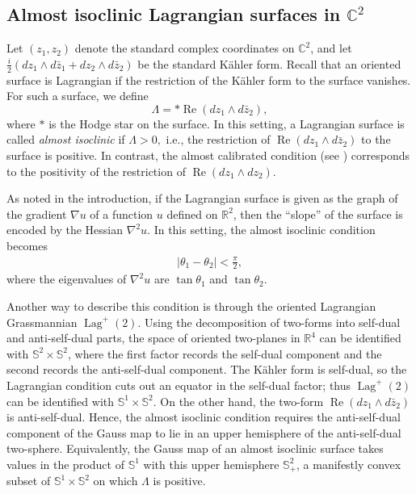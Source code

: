 \documentclass[11pt]{amsart}
\numberwithin{equation}{section}
\theoremstyle{definition}
\theoremstyle{definition}
\begin{document}
\subsection{Almost isoclinic Lagrangian surfaces in $\mathbb{C}^2$}
\label{sec:2D-AI}

Let \((z_1,z_2)\) denote the standard complex coordinates on \(\mathbb{C}^2\), and let
\(
\frac{i}{2}\left(dz_1\wedge d\bar z_1+dz_2\wedge d\bar z_2\right)
\)
be the standard Kähler form. 
Recall that an oriented surface is Lagrangian if the restriction of the Kähler form to the surface vanishes. 
For such a surface, we define \begin{equation}\label{Lambda_n=2}
\Lambda=*\operatorname{Re}\left(dz_1\wedge d\bar z_2\right),
\end{equation} 
where $*$ is the Hodge star on the surface.  
In this setting, a Lagrangian surface is called \textit{almost isoclinic} if $\Lambda>0,$ i.e., the restriction of $\operatorname{Re}\left(dz_1\wedge d\bar z_2\right)$ to the surface is positive. 
In contrast, the almost calibrated condition
(see \cite[Remark~5.1]{W01-JDG}) corresponds to the positivity of the
restriction of
\(
\operatorname{Re}\left(dz_1\wedge dz_2\right).
\)

As noted in the introduction, if the Lagrangian surface is given as the graph
of the gradient \(\nabla u\) of a function \(u\) defined on \(\mathbb{R}^2\),
then the ``slope'' of the surface is encoded by the Hessian \(\nabla^2 u\).
In this setting, the almost isoclinic condition becomes
\begin{align}\label{2d-theta}
|\theta_1-\theta_2|<\frac{\pi}{2},
\end{align}
where the eigenvalues of \(\nabla^2 u\) are \(\tan\theta_1\) and
\(\tan\theta_2\).



Another way to describe this condition is through the oriented Lagrangian Grassmannian \(\operatorname{Lag}^+(2)\). 
Using the decomposition of two-forms into self-dual and anti-self-dual parts, the space of oriented two-planes in \(\mathbb{R}^4\) can be identified with \(\mathbb S^2\times \mathbb S^2\), where the first factor records the self-dual component and the second records the anti-self-dual component. 
The Kähler form is self-dual, so the Lagrangian condition cuts out an equator in the self-dual factor; thus \(\operatorname{Lag}^+(2)\) can be identified with \(\mathbb S^1\times \mathbb S^2\). 
On the other hand, the two-form $\operatorname{Re}\left(dz_1\wedge d\bar z_2\right)$ is anti-self-dual. 
Hence, the almost isoclinic condition requires the anti-self-dual component of the Gauss map to lie in an upper hemisphere of the anti-self-dual two-sphere. 
Equivalently, the Gauss map of an almost isoclinic surface takes values in the product of \(\mathbb S^1\) with this upper hemisphere \(\mathbb S^2_+\), a manifestly convex subset of \(\mathbb S^1\times \mathbb S^2\) on which $\Lambda$ is positive. 
\end{document}
